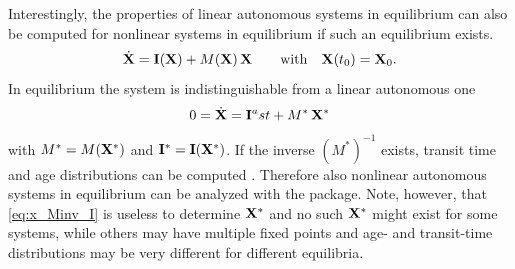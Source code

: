 Interestingly, the properties of linear autonomous systems in equilibrium can
also be computed for nonlinear systems in equilibrium if such an equilibrium
exists.
\begin{equation} \label{eq:NLS}
\dot{\mathbf{X}} = \mathbf{I}(\mathbf{X}) + M(\mathbf{X}) \, \mathbf{X} \qquad  \mathrm{with} \quad \mathbf{X}(t_0) = \mathbf{X}_0.
\end{equation}
In equilibrium the system is indistinguishable from a linear autonomous one
\begin{align} 
  0= \dot{\mathbf{X}} = \mathbf{I}^ast + M^* \, \mathbf{X}^\ast
\end{align}
with $M^\ast=M(\mathbf{X}^\ast)$ and $\mathbf{I}^\ast=\mathbf{I}(\mathbf{X}^\ast)$.
If the inverse $(M^\ast)^{-1}$ exists, transit time and age distributions can be computed 
\citep{Metzler2018MGS}.
Therefore also  nonlinear autonomous
systems in equilibrium can be analyzed with the
\LAPM{} package.
Note, however, that 
\eqref{eq:x_Minv_I} is useless to determine $\mathbf{X}^\ast$ and 
no such $\mathbf{X}^\ast$ might exist for some systems,
while others may have multiple fixed points and age- and
transit-time distributions may be very different for different equilibria.


